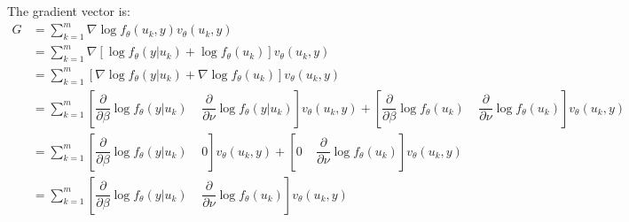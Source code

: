 \documentclass{article}
\begin{document}
The gradient vector is: \\
\begin{align}
G &= \sum_{k=1}^m \nabla \log f_\theta (u_k,y) v_\theta(u_k,y)\\
&= \sum_{k=1}^m \nabla \left[  \log f_\theta(y|u_k) + \log f_\theta (u_k)  \right] v_\theta(u_k,y)\\
&= \sum_{k=1}^m  \left[ \nabla \log f_\theta(y|u_k) + \nabla\log f_\theta (u_k)  \right] v_\theta(u_k,y)\\
&= \sum_{k=1}^m  \left[ \dfrac{\partial}{\partial \beta} \log f_\theta(y|u_k) \; \; \; \;  \dfrac{\partial}{\partial \nu} \log f_\theta(y|u_k) \right] v_\theta(u_k,y)+ \left[ \dfrac{\partial}{\partial \beta} \log f_\theta(u_k) \; \; \; \; \dfrac{\partial}{\partial \nu} \log f_\theta(u_k) \right] v_\theta(u_k,y)\\
&= \sum_{k=1}^m  \left[ \dfrac{\partial}{\partial \beta} \log f_\theta(y|u_k) \; \; \; \; 0 \right] v_\theta(u_k,y)+ \left[ 0 \; \; \; \; \dfrac{\partial}{\partial \nu} \log f_\theta(u_k) \right] v_\theta(u_k,y)\\
&= \sum_{k=1}^m  \left[ \dfrac{\partial}{\partial \beta} \log f_\theta(y|u_k) \; \; \; \; \dfrac{\partial}{\partial \nu} \log f_\theta(u_k) \right] v_\theta(u_k,y)
\end{align}
\end{document}
